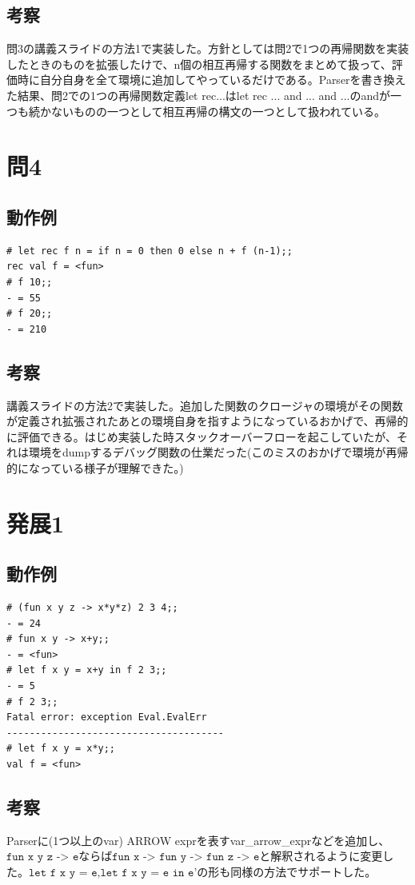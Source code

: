\documentclass[11pt,a4paper]{jsarticle}
\begin{document}
\subsection*{考察}
問3の講義スライドの方法1で実装した。方針としては問2で1つの再帰関数を実装したときのものを拡張したけで、n個の相互再帰する関数をまとめて扱って、評価時に自分自身を全て環境に追加してやっているだけである。Parserを書き換えた結果、問2での1つの再帰関数定義let rec...はlet rec ... and ... and ...のandが一つも続かないものの一つとして相互再帰の構文の一つとして扱われている。
\section*{問4}
\subsection*{動作例}
\begin{lstlisting}[basicstyle=\ttfamily\footnotesize, frame=single]
# let rec f n = if n = 0 then 0 else n + f (n-1);;
rec val f = <fun>
# f 10;;
- = 55
# f 20;;
- = 210
\end{lstlisting}
\subsection*{考察}
講義スライドの方法2で実装した。追加した関数のクロージャの環境がその関数が定義され拡張されたあとの環境自身を指すようになっているおかげで、再帰的に評価できる。はじめ実装した時スタックオーバーフローを起こしていたが、それは環境をdumpするデバッグ関数の仕業だった(このミスのおかげで環境が再帰的になっている様子が理解できた。)
\section*{発展1}
\subsection*{動作例}
\begin{lstlisting}[basicstyle=\ttfamily\footnotesize, frame=single]
# (fun x y z -> x*y*z) 2 3 4;;
- = 24
# fun x y -> x+y;;
- = <fun>
# let f x y = x+y in f 2 3;;
- = 5
# f 2 3;;
Fatal error: exception Eval.EvalErr
--------------------------------------
# let f x y = x*y;;
val f = <fun>
\end{lstlisting}
\subsection*{考察}
Parserに(1つ以上のvar) ARROW exprを表すvar\_arrow\_exprなどを追加し、$\texttt{fun x y z -> e}$ならば$\texttt{fun x -> fun y -> fun z -> e}$と解釈されるように変更した。$\texttt{let f x y = e,let f x y = e in e'}$の形も同様の方法でサポートした。
\end{document}
